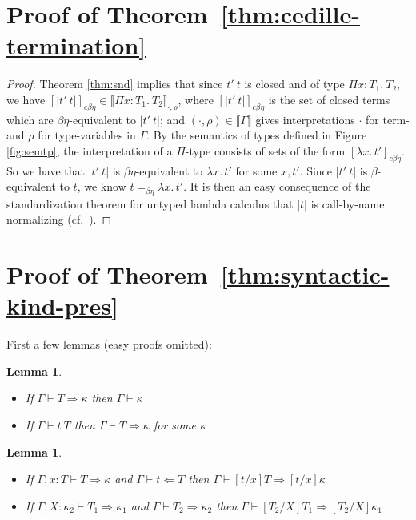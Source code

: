 \documentclass{article}
\newcommand{\interp}[1]{\llbracket #1 \rrbracket}
\newcommand{\tpcheck}[0]{\Leftarrow}
\newcommand{\tpsynth}[0]{\Rightarrow}
\newtheorem{lemma}[theorem]{Lemma}
\begin{document}
\section{Proof of Theorem~\ref{thm:cedille-termination}}
\begin{proof}
Theorem \ref{thm:snd} implies that since
$t'\ t$ is closed and of type $\Pi x:T_1.\ T_2$, we have
$[|t'\ t|]_{c\beta\eta}\in \interp{\Pi x:T_1.\ T_2}_{\cdot,\rho}$,
where $[|t'\ t|]_{c\beta\eta}$ is the set of closed terms which are
$\beta\eta$-equivalent to $|t'\ t|$; and
$(\cdot,\rho)\in\interp{\Gamma}$ gives interpretations $\cdot$ for
term- and $\rho$ for type-variables in $\Gamma$.  By the semantics of
types defined in Figure \ref{fig:semtp}, the
interpretation of a $\Pi$-type consists of sets of the form
$[\lambda x.\,t']_{c\beta\eta}$.  So we have that $|t'\ t|$ is $\beta\eta$-equivalent to
$\lambda x.\, t'$ for some $x, t'$.  
Since $|t'\ t|$ is $\beta$-equivalent to $t$, we know $t =_{\beta\eta} \lambda x.\, t'$.
It is then an easy consequence of the
standardization theorem for untyped lambda calculus that $|t|$ is
call-by-name normalizing (cf.~\cite{Kashima2000}).

\end{proof}

\section{Proof of Theorem~\ref{thm:syntactic-kind-pres}}
\label{sec:proof-syntactic-kind-pres}

First a few lemmas (easy proofs omitted):
\begin{lemma}
  \label{lem:inference-validity}
  \ \\
  \begin{itemize}
  \item If \(\Gamma \vdash T \tpsynth \kappa\) then \(\Gamma \vdash \kappa\)
    
  \item If \(\Gamma \vdash t \ T\) then \(\Gamma \vdash T \tpsynth
    \kappa\) for some \(\kappa\)
  \end{itemize}
\end{lemma}

\begin{lemma}
  \label{lem:subst-kind}
  \ \\
  \begin{itemize}
  \item If \(\Gamma,x:T \vdash T \tpsynth \kappa\) and \(\Gamma \vdash t
    \tpcheck T\) then \(\Gamma \vdash [t/x]T \tpsynth [t/x]\kappa\)
    
  \item If \(\Gamma,X:\kappa_2 \vdash T_1 \tpsynth \kappa_1\) and \(\Gamma
    \vdash T_2 \tpsynth \kappa_2\) then \(\Gamma \vdash [T_2/X]T_1 \tpsynth [T_2/X]\kappa_1\)
  \end{itemize}
\end{lemma}
\end{document}
